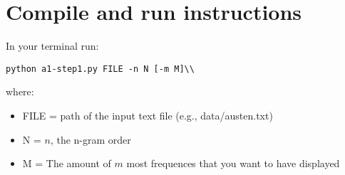 \documentclass[final,12pt]{elsarticle}
\begin{document}
\section{Compile and run instructions}
In your terminal run:
\begin{verbatim}
python a1-step1.py FILE -n N [-m M]\\
\end{verbatim}

where:\\
\begin{itemize}
\item[] FILE = path of the input text file (e.g., data/austen.txt)
\item[] N = $n$, the n-gram order
\item[] M = The amount of $m$ most frequences that you want to have displayed
\end{itemize}
\end{document}
